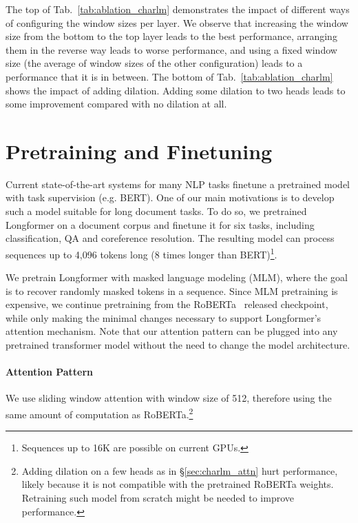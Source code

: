 \documentclass[11pt,a4paper]{article}
\newcommand{\model}{Longformer\xspace}
\begin{document}
The top of Tab.~\ref{tab:ablation_charlm} demonstrates the impact of different ways of configuring the window sizes per layer. We observe that increasing the window size from the bottom 
to the top layer leads to the best performance, arranging them in the reverse way leads to worse performance,
and using a fixed window size (the average of window sizes of the other configuration) leads to a performance that it is in between.
The bottom of Tab.~\ref{tab:ablation_charlm} shows the impact of adding dilation.
Adding some dilation to two heads leads to some improvement compared with 
no dilation at all. 

\section{Pretraining and Finetuning}
\label{sec:pretrain}

Current state-of-the-art systems for many NLP tasks finetune a pretrained model with task supervision (e.g. BERT).
One of our main motivations is to develop such a model suitable for long document tasks.
To do so, we pretrained \model on a document corpus and finetune it for six tasks, including classification, QA and coreference resolution.
The resulting model can process sequences up to 4,096 tokens long (8 times longer than BERT)\footnote{Sequences up to 16K are possible on current GPUs.}.

We pretrain \model with masked language modeling (MLM), where the goal is to recover randomly masked tokens in a sequence. 
Since MLM pretraining is expensive, we continue pretraining from the RoBERTa~\cite{roberta} released checkpoint, while only making the minimal changes necessary to support \model's attention mechanism.
Note that our attention pattern can be plugged into any pretrained transformer model without the need to change the model architecture. 

\paragraph{Attention Pattern}
We use sliding window attention with window size of 512, therefore using the same amount of computation as RoBERTa.\footnote{Adding dilation on a few heads as in \S\ref{sec:charlm_attn} hurt performance, likely because it is not compatible with the pretrained RoBERTa weights. Retraining such model from scratch might be needed to improve performance.
}
\end{document}
